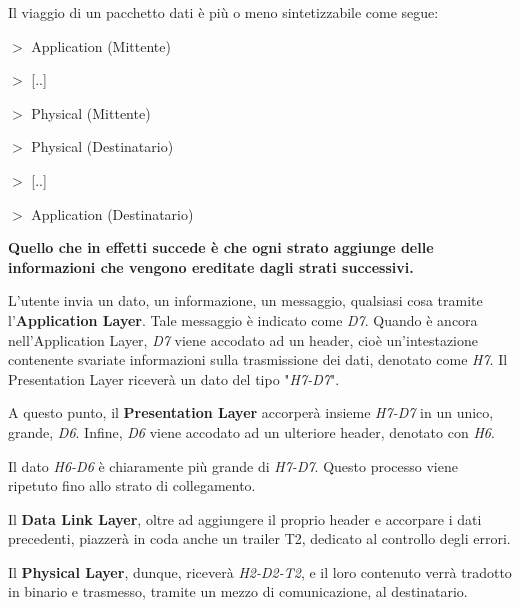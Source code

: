 \vspace{3mm}

Il viaggio di un pacchetto dati è più o meno sintetizzabile come segue:

\vspace{3mm}

\(>\) Application (Mittente) 

\(>\) [..] 

\(>\) Physical (Mittente) 

\(>\) Physical (Destinatario) 

\(>\) [..] 

\(>\) Application (Destinatario)

\vspace{3mm}

\textbf{Quello che in effetti succede è che ogni strato aggiunge delle informazioni che vengono ereditate dagli strati successivi.}

L'utente invia un dato, un informazione, un messaggio, qualsiasi cosa tramite l'\textbf{Application Layer}. Tale messaggio è indicato come \textit{D7}. Quando è ancora nell'Application Layer, \textit{D7} viene accodato ad un header, cioè un'intestazione contenente svariate informazioni sulla trasmissione dei dati, denotato come \textit{H7}. Il Presentation Layer riceverà un dato del tipo "\textit{H7-D7}". 

\vspace{3mm}

A questo punto, il \textbf{Presentation Layer} accorperà insieme \textit{H7-D7} in un unico, grande, \textit{D6}. Infine, \textit{D6} viene accodato ad un ulteriore header, denotato con \textit{H6}. 

\vspace{3mm}

Il dato \textit{H6-D6} è chiaramente più grande di \textit{H7-D7}. Questo processo viene ripetuto fino allo strato di collegamento. 

\vspace{3mm}

Il \textbf{Data Link Layer}, oltre ad aggiungere il proprio header e accorpare i dati precedenti, piazzerà in coda anche un trailer T2, dedicato al controllo degli errori. 

\vspace{3mm}

Il \textbf{Physical Layer}, dunque, riceverà \textit{
H2-D2-T2}, e il loro contenuto verrà tradotto in binario e trasmesso, tramite un mezzo di comunicazione, al destinatario.

